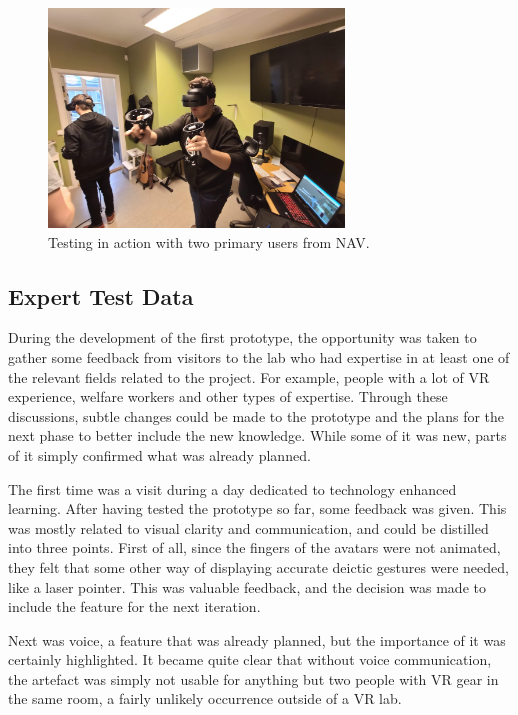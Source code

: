 \begin{figure}[H]
  \centering
    \includegraphics[width=0.7\textwidth]{fig/phase_1/testingPhase1.jpg}
 \caption{Testing in action with two primary users from NAV.}
\label{fig:testingPhase1}
\end{figure}


\subsection{Expert Test Data}
During the development of the first prototype, the opportunity was taken to gather some feedback from visitors to the lab who had expertise in at least one of the relevant fields related to the project. For example, people with a lot of VR experience, welfare workers and other types of expertise. Through these discussions, subtle changes could be made to the prototype and the plans for the next phase to better include the new knowledge. While some of it was new, parts of it simply confirmed what was already planned.

The first time was a visit during a day dedicated to technology enhanced learning. After having tested the prototype so far, some feedback was given. This was mostly related to visual clarity and communication, and could be distilled into three points. First of all, since the fingers of the avatars were not animated, they felt that some other way of displaying accurate deictic gestures were needed, like a laser pointer. This was valuable feedback, and the decision was made to include the feature for the next iteration. 

Next was voice, a feature that was already planned, but the importance of it was certainly highlighted. It became quite clear that without voice communication, the artefact was simply not usable for anything but two people with VR gear in the same room, a fairly unlikely occurrence outside of a VR lab.


